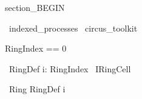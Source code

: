 section_BEGIN
\begin{zsection}
  \SECTION\ indexed\_processes \parents\ circus\_toolkit
\end{zsection}

\begin{zed}
     RingIndex == 0 
\end{zed}

\begin{circus}
	\circprocess\ RingDef \circdef \Interleave i: RingIndex \circindex\ IRingCell
\end{circus}

\begin{circus}
	\circprocess\ Ring \circdef RingDef \lcircindex i \rcircindex
\end{circus}

